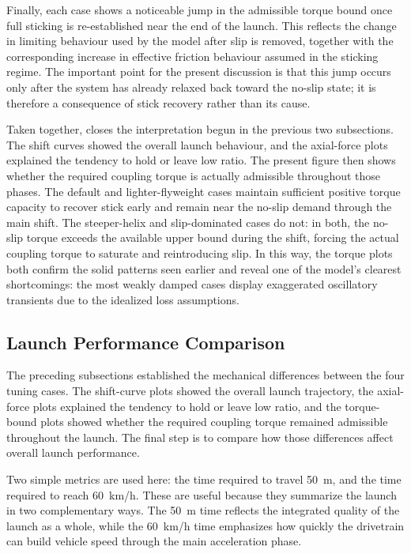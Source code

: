 \documentclass[11pt]{article}
\numberwithin{equation}{section}
\newcounter{assump}
\begin{document}
Finally, each case shows a noticeable jump in the admissible torque bound once
full sticking is re-established near the end of the launch. This reflects the
change in limiting behaviour used by the model after slip is removed, together
with the corresponding increase in effective friction behaviour assumed in the
sticking regime. The important point for the present discussion is that this
jump occurs only after the system has already relaxed back toward the no-slip
state; it is therefore a consequence of stick recovery rather than its cause.

Taken together,  closes the interpretation begun in the
previous two subsections. The shift curves showed the overall launch behaviour,
and the axial-force plots explained the tendency to hold or leave low ratio.
The present figure then shows whether the required coupling torque is actually
admissible throughout those phases. The default and lighter-flyweight cases
maintain sufficient positive torque capacity to recover stick early and remain
near the no-slip demand through the main shift. The steeper-helix and
slip-dominated cases do not: in both, the no-slip torque exceeds the available
upper bound during the shift, forcing the actual coupling torque to saturate and
reintroducing slip. In this way, the torque plots both confirm the solid
patterns seen earlier and reveal one of the model's clearest shortcomings: the
most weakly damped cases display exaggerated oscillatory transients due to the
idealized loss assumptions.

\subsection{Launch Performance Comparison}
\label{sec:results_performance}

The preceding subsections established the mechanical differences between the
four tuning cases. The shift-curve plots showed the overall launch trajectory,
the axial-force plots explained the tendency to hold or leave low ratio, and
the torque-bound plots showed whether the required coupling torque remained
admissible throughout the launch. The final step is to compare how those
differences affect overall launch performance.

Two simple metrics are used here: the time required to travel
\SI{50}{m}, and the time required to reach \SI{60}{km/h}. These are useful
because they summarize the launch in two complementary ways. The
\SI{50}{m} time reflects the integrated quality of the launch as a whole,
while the \SI{60}{km/h} time emphasizes how quickly the drivetrain can build
vehicle speed through the main acceleration phase.
\end{document}
